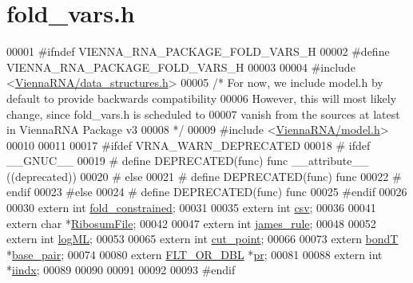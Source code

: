 \hypertarget{fold__vars_8h_source}{}\section{fold\+\_\+vars.\+h}
\label{fold__vars_8h_source}

\begin{DoxyCode}
00001 \textcolor{preprocessor}{#ifndef VIENNA\_RNA\_PACKAGE\_FOLD\_VARS\_H}
00002 \textcolor{preprocessor}{#define VIENNA\_RNA\_PACKAGE\_FOLD\_VARS\_H}
00003 
00004 \textcolor{preprocessor}{#include <\hyperlink{data__structures_8h}{ViennaRNA/data\_structures.h}>}
00005 \textcolor{comment}{/*  For now, we include model.h by default to provide backwards compatibility}
00006 \textcolor{comment}{    However, this will most likely change, since fold\_vars.h is scheduled to}
00007 \textcolor{comment}{    vanish from the sources at latest in ViennaRNA Package v3}
00008 \textcolor{comment}{*/}
00009 \textcolor{preprocessor}{#include <\hyperlink{model_8h}{ViennaRNA/model.h}>}
00010 
00011 
00017 \textcolor{preprocessor}{#ifdef VRNA\_WARN\_DEPRECATED}
00018 \textcolor{preprocessor}{# ifdef \_\_GNUC\_\_}
00019 \textcolor{preprocessor}{#  define DEPRECATED(func) func \_\_attribute\_\_ ((deprecated))}
00020 \textcolor{preprocessor}{# else}
00021 \textcolor{preprocessor}{#  define DEPRECATED(func) func}
00022 \textcolor{preprocessor}{# endif}
00023 \textcolor{preprocessor}{#else}
00024 \textcolor{preprocessor}{# define DEPRECATED(func) func}
00025 \textcolor{preprocessor}{#endif}
00026 
00030 \textcolor{keyword}{extern} \textcolor{keywordtype}{int}    \hyperlink{fold__vars_8h_a0afc287c2464866d94858c39175154af}{fold\_constrained};
00031 
00035 \textcolor{keyword}{extern} \textcolor{keywordtype}{int}  \hyperlink{fold__vars_8h_af2763d55a74663a5e60652b8880baa5b}{csv};
00036 
00041 \textcolor{keyword}{extern} \textcolor{keywordtype}{char} *\hyperlink{fold__vars_8h_a5dbaa0cca2c8c82048a0f0e38e164944}{RibosumFile};   
00042 
00047 \textcolor{keyword}{extern} \textcolor{keywordtype}{int}  \hyperlink{fold__vars_8h_af349001ad3b4d008d0051d935b1b6261}{james\_rule};
00048 
00052 \textcolor{keyword}{extern} \textcolor{keywordtype}{int}  \hyperlink{fold__vars_8h_a80c3c5fd35e7479704cc91d2d0367743}{logML};
00053 
00065 \textcolor{keyword}{extern} \textcolor{keywordtype}{int}  \hyperlink{fold__vars_8h_ab9b2c3a37a5516614c06d0ab54b97cda}{cut\_point};
00066 
00073 \textcolor{keyword}{extern} \hyperlink{group__data__structures_structvrna__bp__stack__s}{bondT}  *\hyperlink{fold__vars_8h_a0244a629b5ab4f58b77590c3dfd130dc}{base\_pair};
00074 
00080 \textcolor{keyword}{extern} \hyperlink{group__data__structures_ga31125aeace516926bf7f251f759b6126}{FLT\_OR\_DBL} *\hyperlink{fold__vars_8h_ac98ec419070aee6831b44e5c700f090f}{pr};
00081 
00088 \textcolor{keyword}{extern} \textcolor{keywordtype}{int}   *\hyperlink{fold__vars_8h_a92089ae3a51b5d75a14ce9cc29cc8317}{iindx};
00089 
00090 
00091 
00092 
00093 \textcolor{preprocessor}{#endif}
\end{DoxyCode}
